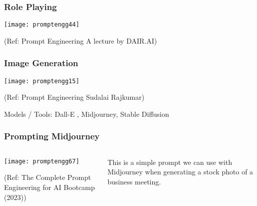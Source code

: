 \begin{frame}[fragile]\frametitle{Role Playing}

\begin{center}
\texttt{[image: promptengg44]}

{\tiny (Ref: Prompt Engineering A lecture by DAIR.AI)}

\end{center}
\end{frame}


\begin{frame}[fragile]\frametitle{Image Generation}

\begin{center}
\texttt{[image: promptengg15]}

{\tiny (Ref: Prompt Engineering Sudalai Rajkumar)}

\end{center}		
		
		
Models / Tools: Dall-E , Midjourney, Stable Diffusion

\end{frame}

\begin{frame}[fragile]\frametitle{Prompting Midjourney}


\begin{columns}
    \begin{column}[T]{0.6\linewidth}
		\begin{center}
		\texttt{[image: promptengg67]}

		{\tiny (Ref: The Complete Prompt Engineering for AI Bootcamp (2023))}
		\end{center}	
    \end{column}
    \begin{column}[T]{0.4\linewidth}
		This is a simple prompt we can use with Midjourney when generating a stock photo of a business meeting.
    \end{column}
  \end{columns}
\end{frame}

